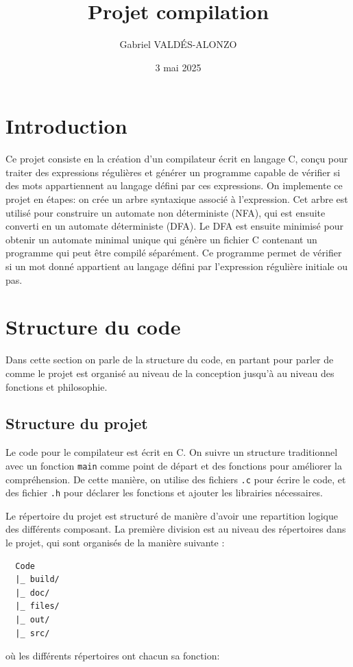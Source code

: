 \documentclass[12pt]{article}
\title{Projet compilation}
\author{Gabriel VALDÉS-ALONZO}
\date{3 mai 2025}
\begin{document}
\maketitle
\thispagestyle{empty}
\clearpage
\setcounter{page}{1}
\section{Introduction}
Ce projet consiste en la création d'un compilateur écrit en langage C, conçu pour traiter des expressions régulières et générer un programme capable de vérifier si des mots appartiennent au langage défini par ces expressions. On implemente ce projet en étapes: on crée un arbre syntaxique associé à l'expression. Cet arbre est utilisé pour construire un automate non déterministe (NFA), qui est ensuite converti en un automate déterministe (DFA). Le DFA est ensuite minimisé pour obtenir un automate minimal unique qui génère un fichier C contenant un programme qui peut être compilé séparément. Ce programme permet de vérifier si un mot donné appartient au langage défini par l'expression régulière initiale ou pas. 

\section{Structure du code}
Dans cette section on parle de la structure du code, en partant pour parler de comme le projet est organisé au niveau de la conception jusqu'à au niveau des fonctions et philosophie.
\subsection{Structure du projet}
Le code pour le compilateur est écrit en C. On suivre un structure traditionnel avec un fonction \texttt{main} comme point de départ et des fonctions pour améliorer la compréhension. De cette manière, on utilise des fichiers \texttt{.c} pour écrire le code, et des fichier \texttt{.h} pour déclarer les fonctions et ajouter les librairies nécessaires.

Le répertoire du projet est structuré de manière d'avoir une repartition logique des différents composant. La première division est au niveau des répertoires dans le projet, qui sont organisés de la manière suivante :
\begin{verbatim}
  Code
  |_ build/
  |_ doc/
  |_ files/
  |_ out/
  |_ src/
\end{verbatim}

\noindent où les différents répertoires ont chacun sa fonction:
\end{document}
